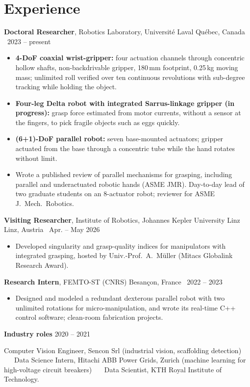 \documentclass[10pt,letterpaper]{article}
\newcommand{\role}[4]{\textbf{#1}, #2 \hfill {\color{muted}#3 \textbar\ #4}\par}
\begin{document}
\section{Experience}
\role{Doctoral Researcher}{Robotics Laboratory, Universit\'e Laval}{Qu\'ebec, Canada}{2023 -- present}
\begin{itemize}
\item \textbf{4-DoF coaxial wrist-gripper:} four actuation channels through concentric hollow shafts, non-backdrivable
gripper, 180\,mm footprint, 0.25\,kg moving mass; unlimited roll verified over ten continuous revolutions with
sub-degree tracking while holding the object.
\item \textbf{Four-leg Delta robot with integrated Sarrus-linkage gripper (in progress):} grasp force estimated from motor
currents, without a sensor at the fingers, to pick fragile objects such as eggs quickly.
\item \textbf{(6+1)-DoF parallel robot:} seven base-mounted actuators; gripper actuated from the base through a concentric
tube while the hand rotates without limit.
\item Wrote a published review of parallel mechanisms for grasping, including parallel and underactuated robotic hands
(ASME JMR). Day-to-day lead of two graduate students on an 8-actuator robot; reviewer for ASME J.\ Mech.\ Robotics.
\end{itemize}

\vspace{3pt}
\role{Visiting Researcher}{Institute of Robotics, Johannes Kepler University Linz}{Linz, Austria}{Apr. -- May 2026}
\begin{itemize}
\item Developed singularity and grasp-quality indices for manipulators with integrated grasping, hosted by Univ.-Prof.~A.~M\"uller (Mitacs Globalink Research Award).
\end{itemize}

\vspace{3pt}
\role{Research Intern}{FEMTO-ST (CNRS)}{Besan\c{c}on, France}{2022 -- 2023}
\begin{itemize}
\item Designed and modeled a redundant dexterous parallel robot with two unlimited rotations for micro-manipulation, and wrote its real-time C++ control software; clean-room fabrication projects.
\end{itemize}

\vspace{3pt}
\textbf{Industry roles} \hfill {\color{muted}2020 -- 2021}\par
{\small Computer Vision Engineer, Sencon Srl (industrial vision, scaffolding detection) \ \textbullet\ \ Data Science
Intern, Hitachi ABB Power Grids, Zurich (machine learning for high-voltage circuit breakers) \ \textbullet\ \ Data
Scientist, KTH Royal Institute of Technology.}
\end{document}
